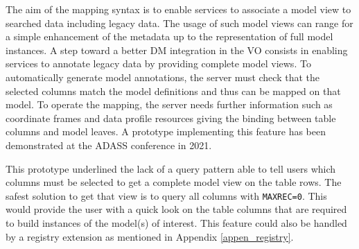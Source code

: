 The aim of the mapping syntax is to enable services to associate a model view to searched data including legacy data.
The usage of such model views can range for a simple enhancement of the metadata up to the representation of full model instances.
A step toward a better DM integration in the VO consists in enabling services to annotate
legacy data by providing complete model
views. 
To automatically generate model annotations, the server must check that the selected columns 
match the model definitions and thus can be
mapped on that model. To operate the mapping, the server needs further information
such as coordinate frames and data profile resources giving the binding between table
columns and model leaves. A prototype \citep{2201.01732} implementing this feature
has been demonstrated at the ADASS conference in 2021.

This prototype underlined the lack of a query pattern able to tell users which columns must be selected to get a 
complete model view on the table rows. The safest solution to get that view is to query all columns with \texttt{MAXREC=0}.
This would provide the user with a quick look on the table columns that are required to build instances of the model(s) of interest.
This feature could also be handled by a registry extension as mentioned in Appendix \ref{appen_registry}.

